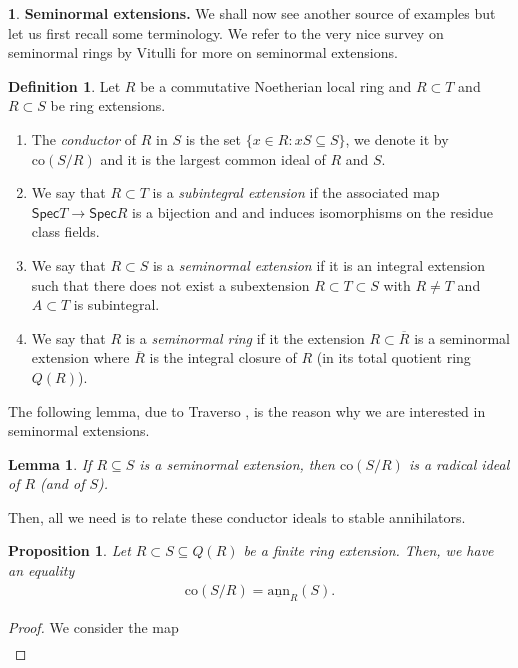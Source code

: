 \documentclass[12pt]{amsart}
\newcommand{\sann}{\underline{\mathrm{ann}}}
\newcommand\co{\mathrm{co}}
\newcommand{\spec}{\mathsf{Spec}}
\newtheorem{lemma}[theorem]{Lemma}
\newtheorem{proposition}[theorem]{Proposition}
\theoremstyle{definition}
\newtheorem{definition}[theorem]{Definition}
\newtheorem{chunk}[theorem]{}
\numberwithin{equation}{theorem}
\begin{document}
\begin{chunk}
    \textbf{Seminormal extensions.} We shall now see another source of examples but let us first recall some terminology. We refer to the very nice survey on seminormal rings \cite{Vitulli} by Vitulli for more on seminormal extensions.
    \begin{definition}
        Let $R$ be a commutative Noetherian local ring and $R \subset T $ and $R\subset S$ be ring extensions.
        \begin{enumerate}
            \item The \textit{conductor} of $R$ in $S$ is the set $\{ x \in R \colon xS \subseteq S\}$, we denote it by $\co(S/R)$ and it is the largest common ideal of $R$ and $S$. 
            \item We say that $R \subset T$ is a \textit{subintegral extension} if the associated map $\spec T \to \spec R$ is a bijection and and induces isomorphisms on the residue class fields.
            \item We say that $R \subset S$ is a \textit{seminormal extension} if it is an integral extension such that there does not exist a subextension $R \subset T \subset S$ with $R \neq T$ and $A \subset T$ is subintegral.
            \item We say that $R$ is a \textit{seminormal ring} if it the extension $R \subset \overline{R}$ is a seminormal extension where $\overline{R}$ is the integral closure of $R$ (in its total quotient ring $Q(R)$).
        \end{enumerate}
    \end{definition}
    The following lemma, due to Traverso \cite{Traverso}, is the reason why we are interested in seminormal extensions.
    \begin{lemma}
        If $R \subseteq S$ is a seminormal extension, then $\co(S/R)$ is a radical ideal of $R$ (and of $S$).
    \end{lemma}
    Then, all we need is to relate these conductor ideals to stable annihilators.
    \begin{proposition}
        Let $R \subset S \subseteq Q(R)$ be a finite ring extension. Then, we have an equality
        \begin{align*}
            \co(S/R) = \sann_R(S).
        \end{align*}
    \end{proposition}
    \begin{proof}
        We consider the map
        \begin{align*}

\end{align*}
\end{proof}
\end{chunk}
\end{document}
